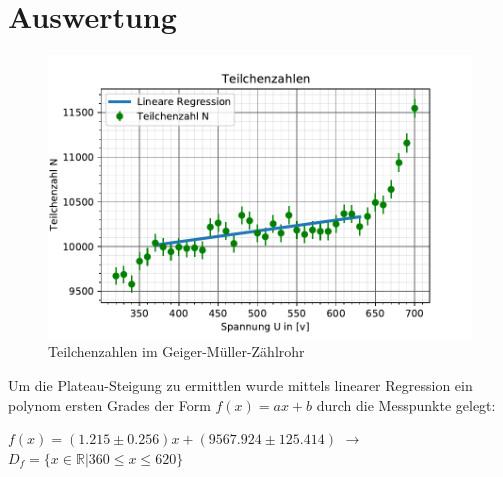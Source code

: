 \section{Auswertung}
\label{sec:auswertung}

\begin{figure}
    \centering
    \includegraphics{kennlinie.pdf}
    \caption{Teilchenzahlen im Geiger-Müller-Zählrohr}
    \label{fig:teilchenzahl}
  \end{figure}
Um die Plateau-Steigung zu ermittlen wurde mittels linearer Regression ein polynom ersten Grades der 
Form $f(x)=ax+b$ durch die Messpunkte gelegt:
\begin{center}
    $f(x)=(1.215\pm0.256)x + (9567.924\pm125.414)$ $\rightarrow$ $D_f=\{x\in\mathbb{R} \vert 360\le x\le620\}$    
\end{center}
